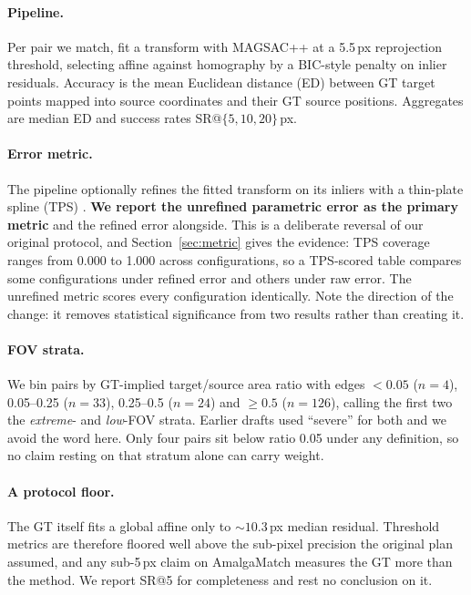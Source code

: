 \documentclass[10pt]{article}
\begin{document}
\paragraph{Pipeline.} Per pair we match, fit a transform with MAGSAC++ \citep{barath2020magsac} at a 5.5\,px reprojection threshold, selecting affine against homography by a BIC-style penalty on inlier residuals. Accuracy is the mean Euclidean distance (ED) between GT target points mapped into source coordinates and their GT source positions. Aggregates are median ED and success rates SR@$\{5,10,20\}$\,px.

\paragraph{Error metric.} The pipeline optionally refines the fitted transform on its inliers with a thin-plate spline (TPS) \citep{bookstein1989tps}. \textbf{We report the unrefined parametric error as the primary metric} and the refined error alongside. This is a deliberate reversal of our original protocol, and Section~\ref{sec:metric} gives the evidence: TPS coverage ranges from 0.000 to 1.000 across configurations, so a TPS-scored table compares some configurations under refined error and others under raw error. The unrefined metric scores every configuration identically. Note the direction of the change: it removes statistical significance from two results rather than creating it.

\paragraph{FOV strata.} We bin pairs by GT-implied target/source area ratio with edges ${<}0.05$ ($n=4$), 0.05--0.25 ($n=33$), 0.25--0.5 ($n=24$) and ${\ge}0.5$ ($n=126$), calling the first two the \emph{extreme}- and \emph{low}-FOV strata. Earlier drafts used ``severe'' for both and we avoid the word here. Only four pairs sit below ratio 0.05 under any definition, so no claim resting on that stratum alone can carry weight.

\paragraph{A protocol floor.} The GT itself fits a global affine only to ${\sim}10.3$\,px median residual. Threshold metrics are therefore floored well above the sub-pixel precision the original plan assumed, and any sub-5\,px claim on AmalgaMatch measures the GT more than the method. We report SR@5 for completeness and rest no conclusion on it.
\end{document}
